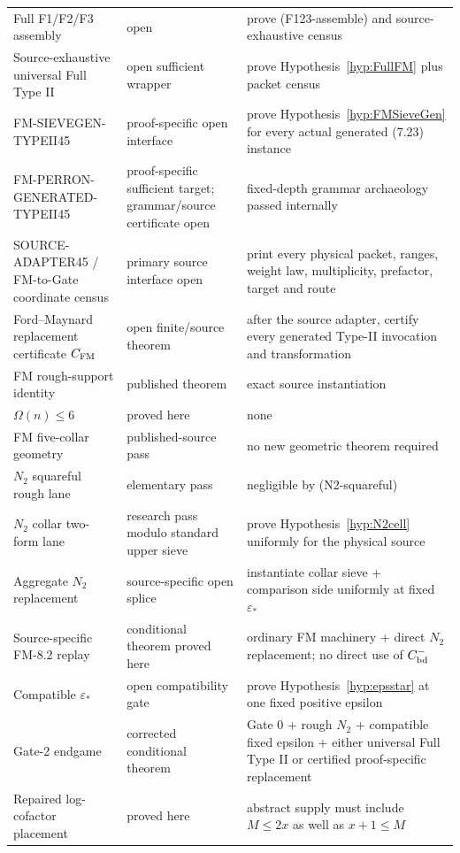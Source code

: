 \documentclass[11pt]{article}
\theoremstyle{definition}
\theoremstyle{remark}
\newcommand{\1}{\mathbf 1}
\begin{document}
\begin{longtable}{p{}p{}p{}}
Full F1/F2/F3 assembly & open & prove (F123-assemble) and source-exhaustive census\\
Source-exhaustive universal Full Type II & open sufficient wrapper & prove Hypothesis~\ref{hyp:FullFM} plus packet census\\
FM-SIEVEGEN-TYPEII45 & proof-specific open interface & prove Hypothesis~\ref{hyp:FMSieveGen} for every actual generated (7.23) instance\\
FM-PERRON-GENERATED-TYPEII45 & proof-specific sufficient target; grammar/source certificate open & fixed-depth grammar archaeology passed internally\\
SOURCE-ADAPTER45 / FM-to-Gate coordinate census & primary source interface open & print every physical packet, ranges, weight law, multiplicity, prefactor, target and route\\
Ford--Maynard replacement certificate $C_{\rm FM}$ & open finite/source theorem & after the source adapter, certify every generated Type-II invocation and transformation\\
FM rough-support identity & published theorem & exact source instantiation\\
$\Omega(n)\le6$ & proved here & none\\
FM five-collar geometry & published-source pass & no new geometric theorem required\\
$N_2$ squareful rough lane & elementary pass & negligible by (N2-squareful)\\
$N_2$ collar two-form lane & research pass modulo standard upper sieve & prove Hypothesis~\ref{hyp:N2cell} uniformly for the physical source\\
Aggregate $N_2$ replacement & source-specific open splice & instantiate collar sieve + comparison side uniformly at fixed $\varepsilon_*$\\
Source-specific FM-8.2 replay & conditional theorem proved here & ordinary FM machinery + direct $N_2$ replacement; no direct use of $C^-_{\rm bd}$\\
Compatible $\varepsilon_*$ & open compatibility gate & prove Hypothesis~\ref{hyp:epsstar} at one fixed positive epsilon\\
Gate-2 endgame & corrected conditional theorem & Gate 0 + rough $N_2$ + compatible fixed epsilon + either universal Full Type II or certified proof-specific replacement\\
Repaired log-cofactor placement & proved here & abstract supply must include $M\le2x$ as well as $x+1\le M$\\

\end{longtable}
\end{document}
